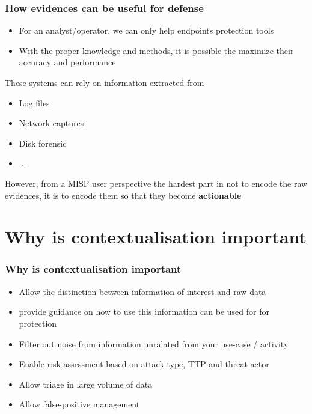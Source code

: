 \begin{frame}
    \frametitle{How evidences can be useful for defense}
    \begin{itemize}
        \item For an analyst/operator, we can only help endpoints protection tools
        \item With the proper knowledge and methods, it is possible the maximize their accuracy and performance
    \end{itemize}

    These systems can rely on information extracted from
    \begin{itemize}
        \item Log files
        \item Network captures
        \item Disk forensic
        \item ...
    \end{itemize}
    
    However, from a MISP user perspective the hardest part in not to encode the raw evidences, it is to encode them so that they become \textbf{actionable}
\end{frame}

\section{Why is contextualisation important}
\begin{frame}
    \frametitle{Why is contextualisation important}
    \begin{itemize}
        \item Allow the distinction between information of interest and raw data
        \item provide guidance on how to use this information can be used for for protection
        \item Filter out noise from information unralated from your use-case / activity
        \item Enable risk assessment based on attack type, TTP and threat actor
        \item Allow triage in large volume of data
        \item Allow false-positive management
    \end{itemize}

\end{frame}

